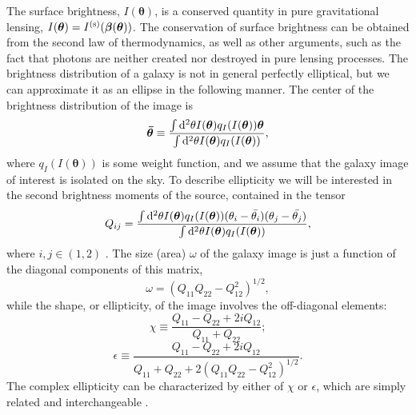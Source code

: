 The surface brightness, $I(\bm{\theta})$, is a conserved quantity in pure gravitational lensing, $I(\bm{\theta}) = I^{({\rm s})}(\bm{\beta}(\bm{\theta}))$. The conservation of surface brightness can be obtained from the second law of thermodynamics, as well as other arguments, such as the fact that photons are neither created nor destroyed in pure lensing processes. The brightness distribution of a galaxy is not in general perfectly elliptical, but we can approximate it as an ellipse in the following manner. The center of the brightness distribution of the image is
\begin{equation}
\bm{\bar{\theta}} \equiv \frac{\int {\rm d}^2\theta I(\bm{\theta}) q_I( I(\bm{\theta})) \bm{\theta}}{\int {\rm d}^2\theta I(\bm{\theta}) q_I( I(\bm{\theta}))},
\end{equation}
where $q_I( I(\bm{\theta}))$ is some weight function, and we assume that the galaxy image of interest is isolated on the sky. To describe ellipticity we will be interested in the second brightness moments of the source, contained in the tensor
\begin{equation}
Q_{ij} = \frac{\int {\rm d}^2\theta I(\bm{\theta}) q_I( I(\bm{\theta})) (\theta_i - \bar{\theta_i})(\theta_j - \bar{\theta_j})}{\int {\rm d}^2\theta I(\bm{\theta}) q_I( I(\bm{\theta}))},
\end{equation}
where $i,j \in (1,2)$ \citep{Schneider06_WeakGravLens}. The size (area) $\omega$ of the galaxy image is just a function of the diagonal components of this matrix,
\begin{equation} 
\label{eqn:size}
\omega = (Q_{11}Q_{22} - Q_{12}^2)^{1/2},
\end{equation}
while the shape, or ellipticity, of the image involves the off-diagonal elements:
\begin{equation} 
\chi \equiv \frac{Q_{11} - Q_{22} + 2i Q_{12}}{Q_{11} + Q_{22}};
\end{equation}
\begin{equation} 
\epsilon \equiv \frac{Q_{11} - Q_{22} + 2i Q_{12}}{Q_{11} + Q_{22} + 2(Q_{11}Q_{22} - Q_{12}^2)^{1/2}}.
\end{equation}
The complex ellipticity can be characterized by either of $\chi$ or $\epsilon$, which are simply related and interchangeable \citep[in different situations one may be easier to work with,][]{BS01}. 


